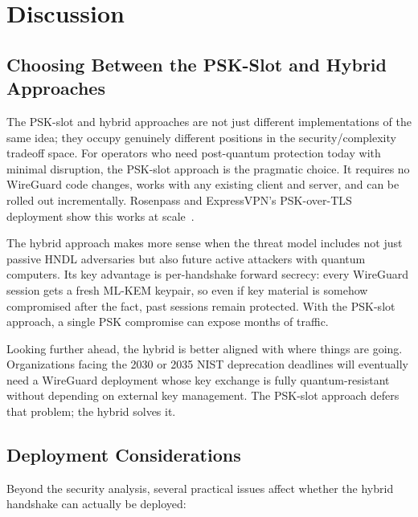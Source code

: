 \chapter{Discussion}
\label{chap:discussion}

\section{Choosing Between the PSK-Slot and Hybrid Approaches}

The PSK-slot and hybrid approaches are not just different implementations of the same idea; they occupy genuinely different positions in the security/complexity tradeoff space. For operators who need post-quantum protection today with minimal disruption, the PSK-slot approach is the pragmatic choice. It requires no WireGuard code changes, works with any existing client and server, and can be rolled out incrementally. Rosenpass and ExpressVPN's PSK-over-TLS deployment show this works at scale~\cite{rosenpass,membrey2025expressvpn}.

The hybrid approach makes more sense when the threat model includes not just passive HNDL adversaries but also future active attackers with quantum computers. Its key advantage is per-handshake forward secrecy: every WireGuard session gets a fresh ML-KEM keypair, so even if key material is somehow compromised after the fact, past sessions remain protected. With the PSK-slot approach, a single PSK compromise can expose months of traffic.

Looking further ahead, the hybrid is better aligned with where things are going. Organizations facing the 2030 or 2035 NIST deprecation deadlines will eventually need a WireGuard deployment whose key exchange is fully quantum-resistant without depending on external key management. The PSK-slot approach defers that problem; the hybrid solves it.

\section{Deployment Considerations}

Beyond the security analysis, several practical issues affect whether the hybrid handshake can actually be deployed:

